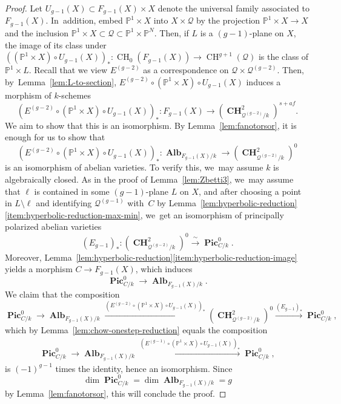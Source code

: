 \documentclass[JEP,XML,SOM,Unicode,NoEqCountersInSection,published]{cedram}
\theoremstyle{plain}
\theoremstyle{definition}
\DeclareMathOperator{\bAlb}{\mathbf{Alb}}
\DeclareMathOperator{\CH}{CH}
\DeclareMathOperator{\bCH}{\mathbf{CH}}
\DeclareMathOperator{\bPic}{\mathbf{Pic}}
\renewcommand\P{\mathbb{P}}
\begin{document}
\begin{proof}
Let \(U_{g-1}(X)\subset F_{g-1}(X)\times X\) denote the universal family associated to \(F_{g-1}(X)\). In~addition, embed $\P^1\times X$ into $X\times \mathcal{Q}$ by the projection $\P^1\times X\to X$ and the inclusion $\P^1\times X\subset\mathcal{Q}\subset \P^1\times \P^N$.
Then, if \(L\) is a \((g-1)\)-plane on \(X\), the image of its class under \(((\mathbb P^1\times X)\circ U_{g-1}(X))_*\colon \CH_0(F_{g-1}(X)) \to \CH^{g+1}(\mathcal Q)\) is the class of \(\mathbb P^1\times L\).
Recall that we view \(E^{(g-2)}\) as a correspondence on \(\mathcal Q\times\mathcal Q^{(g-2)}\). Then, by~Lemma~\ref{lem:L-to-section},
$E^{(g-2)}\circ (\P^1\times X)\circ U_{g-1}(X)$ induces a morphism of $k$\nobreakdash-schemes
\[
(E^{(g-2)}\circ (\P^1\times X)\circ U_{g-1}(X))_*\colon
F_{g-1}(X)\to (\bCH^2_{\mathcal{Q}^{(g-2)}/k})^{s+af}.
\]
We aim to show that this is an isomorphism.
By
Lemma~\ref{lem:fanotorsor},
it is enough for us to show that
\[
(E^{(g-2)}\circ (\P^1\times X)\circ U_{g-1}(X))_*\colon \bAlb_{F_{g-1}(X)/k}\to (\bCH^2_{\mathcal{Q}^{(g-2)}/k})^0
\]
is an isomorphism of abelian varieties.
To verify this, we~may assume \(k\) is algebraically closed.
As in the proof of Lemma~\ref{lem:Zbetti3}, we~may assume that $\ell$ is contained in some $(g-1)$-plane $L$ on $X$,
and after choosing a point in $L\setminus \ell$ and identifying $\mathcal{Q}^{(g-1)}$ with~$C$ by Lemma~\ref{lem:hyperbolic-reduction}\eqref{item:hyperbolic-reduction-max-min}, we~get an isomorphism of principally polarized abelian varieties
\[
(E_{g-1})_*\colon (\bCH^2_{\mathcal{Q}^{(g-2)}/k})^0\xrightarrow{\;\sim\;}\bPic_{C/k}^0.
\]
Moreover,
Lemma~\ref{lem:hyperbolic-reduction}\eqref{item:hyperbolic-reduction-image}
yields a morphism
$C\to F_{g-1}(X)$, which induces
\[
\bPic_{C/k}^0\to \bAlb_{F_{g-1}(X)/k}.
\]
We claim that the composition
\[
\bPic^0_{C/k}\to \bAlb_{F_{g-1}(X)/k}\xrightarrow{(E^{(g-2)}\circ (\P^1\times X)\circ U_{g-1}(X))_*}(\bCH^2_{\mathcal{Q}^{(g-2)}/k})^0\xrightarrow{(E_{g-1})_*}\bPic^0_{C/k},
\]
which by Lemma~\ref{lem:chow-onestep-reduction} equals the composition
\begin{align}\label{eq-composition}
\bPic^0_{C/k}\to \bAlb_{F_{g-1}(X)/k}\xrightarrow{(E^{(g-1)}\circ (\P^1\times X)\circ U_{g-1}(X))_*}\bPic^0_{C/k},
\end{align}
is $(-1)^{g-1}$ times the identity, hence an isomorphism. Since
\[
\dim \bPic_{C/k}^0=\dim \bAlb_{F_{g-1}(X)/k}=g
\]
by Lemma~\ref{lem:fanotorsor},
this will conclude the proof.


\end{proof}
\end{document}
